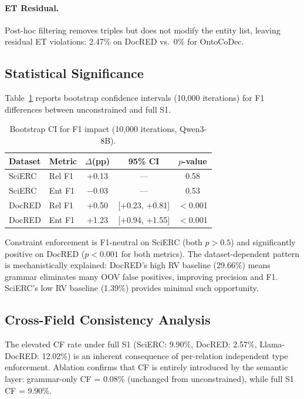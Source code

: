 \documentclass[11pt,a4paper]{article}
\newcommand{\sys}{OntoCoDec}
\begin{document}
\paragraph{ET Residual.} Post-hoc filtering removes triples but does not modify the entity list, leaving residual ET violations: 2.47\% on DocRED vs.\ 0\% for \sys{}.

\subsection{Statistical Significance}
\label{sec:bootstrap}

Table~\ref{tab:bootstrap} reports bootstrap confidence intervals (10,000 iterations) for F1 differences between unconstrained and full S1.

\begin{table}[t]
\centering
\small
\caption{Bootstrap CI for F1 impact (10,000 iterations, Qwen3-8B).}
\label{tab:bootstrap}
\begin{tabular}{llccc}
\toprule
\textbf{Dataset} & \textbf{Metric} & \textbf{$\Delta$(pp)} & \textbf{95\% CI} & \textbf{$p$-value} \\
\midrule
SciERC & Rel F1 & $+$0.13 & --- & 0.58 \\
SciERC & Ent F1 & $-$0.03 & --- & 0.53 \\
DocRED & Rel F1 & $+$0.50 & [$+$0.23, $+$0.81] & $<$0.001 \\
DocRED & Ent F1 & $+$1.23 & [$+$0.94, $+$1.55] & $<$0.001 \\
\bottomrule
\end{tabular}
\end{table}

Constraint enforcement is F1-neutral on SciERC (both $p > 0.5$) and significantly positive on DocRED ($p < 0.001$ for both metrics). The dataset-dependent pattern is mechanistically explained: DocRED's high RV baseline (29.66\%) means grammar eliminates many OOV false positives, improving precision and F1. SciERC's low RV baseline (1.39\%) provides minimal such opportunity.

\subsection{Cross-Field Consistency Analysis}
\label{sec:cf-analysis}

The elevated CF rate under full S1 (SciERC: 9.90\%, DocRED: 2.57\%, Llama-DocRED: 12.02\%) is an inherent consequence of per-relation independent type enforcement. Ablation confirms that CF is entirely introduced by the semantic layer: grammar-only CF = 0.08\% (unchanged from unconstrained), while full S1 CF = 9.90\%.
\end{document}
